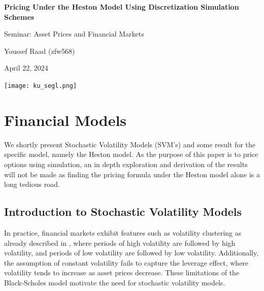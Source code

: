 \documentclass[11pt]{article}
\numberwithin{equation}{section}
\begin{document}
\begin{titlepage}
    \begin{center}
        \vspace*{1cm}
        
        
        \Huge
        \textbf{Pricing Under the Heston Model Using Discretization Simulation Schemes}
        
        \vspace{0.5cm}
        \LARGE
        Seminar: Asset Prices and Financial Markets
        
        \vspace{0.5cm}
        
        Youssef Raad (zfw568)
    
        
        \vspace{0.5cm}
        April 22, 2024
        
    \end{center}
    \vspace{2.5cm}
    \begin{center}
        \texttt{[image: ku\_segl.png]}
    \end{center}
    \vspace{5.5cm}
\end{titlepage}
\captionsetup[figure]{labelfont=bf} \captionsetup[table]{labelfont=bf}
\fancyhead[R]{ }
\setlength{\headheight}{40pt}
\newpage
\tableofcontents
\newtheorem{theorem}{Theorem}[section]
\newtheorem{corollary}{Corollary}[section]
\newtheorem{lemma}{Lemma}[section]
\newtheorem{proposition}{Proposition}[section]
\cfoot{\thepage\ / \pageref{LastPage}}
\newpage
\section{Financial Models}
We shortly present Stochastic Volatility Models (SVM's) and some result for the
specific model, namely the Heston model. As the purpose of this paper is to
price options using simulation, an in depth exploration and derivation of the
results will not be made as finding the pricing formula under the Heston model
alone is a long tedious road.
\subsection{Introduction to Stochastic Volatility Models}
In practice, financial markets exhibit features such as volatility clustering as
already described in \cite{Mandelbrot1963},
where periods of high volatility are followed by high volatility, and periods of
low volatility are followed by low volatility. Additionally, the assumption of
constant volatility fails to capture the leverage effect, where volatility tends
to increase as asset prices decrease. These limitations of the Black-Scholes
model motivate the need for stochastic volatility models.
\end{document}
